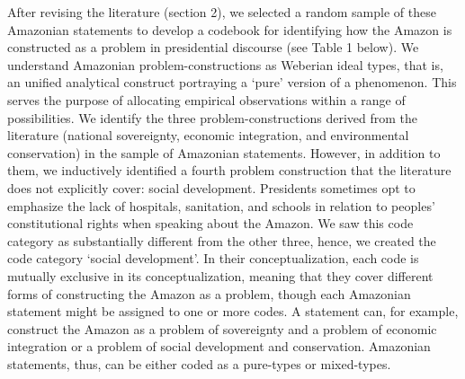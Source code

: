 \documentclass[
]{article}
\begin{document}
After revising the literature (section 2), we selected a random sample
of these Amazonian statements to develop a codebook for identifying how
the Amazon is constructed as a problem in presidential discourse (see
Table 1 below). We understand Amazonian problem-constructions as
Weberian ideal types, that is, an unified analytical construct
portraying a `pure' version of a phenomenon. This serves the purpose of
allocating empirical observations within a range of possibilities. We
identify the three problem-constructions derived from the literature
(national sovereignty, economic integration, and environmental
conservation) in the sample of Amazonian statements. However, in
addition to them, we inductively identified a fourth problem
construction that the literature does not explicitly cover: social
development. Presidents sometimes opt to emphasize the lack of
hospitals, sanitation, and schools in relation to peoples'
constitutional rights when speaking about the Amazon. We saw this code
category as substantially different from the other three, hence, we
created the code category `social development'. In their
conceptualization, each code is mutually exclusive in its
conceptualization, meaning that they cover different forms of
constructing the Amazon as a problem, though each Amazonian statement
might be assigned to one or more codes. A statement can, for example,
construct the Amazon as a problem of sovereignty and a problem of
economic integration or a problem of social development and
conservation. Amazonian statements, thus, can be either coded as a
pure-types or mixed-types.
\end{document}
